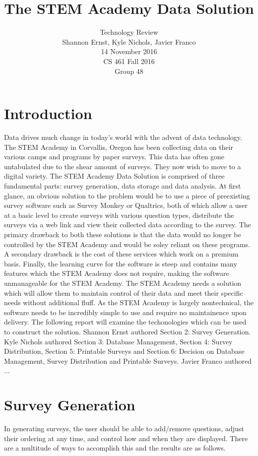 \documentclass[letterpaper,10pt,serif, draftclsnofoot,onecolumn, compsoc, titlepage]{IEEEtran}
\title{The STEM Academy Data Solution}
\author{Technology Review \\ Shannon Ernst, Kyle Nichols, Javier Franco\\ 14 November 2016\\ CS 461 Fall 2016\\ Group 48}
\begin{document}
\maketitle
\begin{abstract}
\end{abstract}
\newpage
\section{Introduction}
Data drives much change in today's world with the advent of data technology. The STEM Academy in Corvallis,
 Oregon has been collecting data on their various camps and programs by paper surveys. This data has often 
gone untabulated due to the shear amount of surveys. They now wish to move to a digital variety.
 The STEM Academy Data Solution is comprised of three fundamental parts: survey generation, data storage and data analysis.
At first glance, an obvious solution to the problem would be to use a piece of preexisting survey software such as Survey Monkey \cite{surveyMonkey}
or Qualtrics\cite{qualtrics}, both of which allow a user at a basic level to create surveys with various question types, distribute the surveys 
via a web link and view their collected data according to the survey. The primary drawback to both these solutions is that the 
data would no longer be controlled by the STEM Academy and would be soley reliant on these programs. A secondary drawback
 is the cost of these services which work on a premium basis\cite{surveyMonkeyCost}. Finally, the learning curve for the software is steep and contains
many features which the STEM Academy does not require, making the software unmanageable for the STEM Academy. 
The STEM Academy needs a solution which will allow them to maintain control of their data and meet their specific needs without
additional fluff. As the STEM Academy is largely nontechnical, the software needs to be incredibly simple to use and require no 
maintainence upon delivery. The following report will examine the techonologies which can be used to construct the solution. Shannon Ernst authored Section 2: Survey Generation. Kyle Nichols authored Section 3: Database Management, Section 4: Survey Distribution, Section 5: Printable Surveys and Section 6: Decision on Database Management, Survey Distribution and Printable Surveys. Javier Franco authored ... 
\section{Survey Generation}
In generating surveys, the user should be able to add/remove questions, adjust their ordering at any time, and control how 
and when they are displayed. There are a multitude of ways to accomplish this and the results are as follows. 
\end{document}

